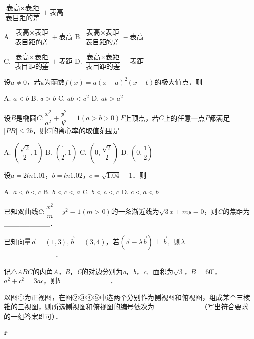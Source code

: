 \documentclass[a4paper,11pt]{report}
\begin{document}
\begin{examquestions}
$\dfrac{\text{表高}\times\text{表距}}{\text{表目距的差}}+\text{表高}$

A.
$\dfrac{\text{表高}\times\text{表距}}{\text{表目距的差}}+\text{表高}$
B.
$\dfrac{\text{表高}\times\text{表距}}{\text{表目距的差}}-\text{表高}$

C.
$\dfrac{\text{表高}\times\text{表距}}{\text{表目距的差}}+\text{表距}$
D.
$\dfrac{\text{表高}\times\text{表距}}{\text{表目距的差}}-\text{表距}$

\item 
设$a\ne0$，若$a$为函数$f(x)=a(x-a)^{2}(x-b)$的极大值点，则

A.
$a<b$
B.
$a>b$
C.
$ab<a^{2}$
D.
$ab>a^{2}$

\item 
设$B$是椭圆$C:\dfrac{x^{2}}{a^{2}}+\dfrac{y^{2}}{b^{2}}=1(a>b>0)$$F$上顶点，若$C$上的任意一点$P$都满足$|PB|\leq2b$，则$C$的离心率的取值范围是

A.
$(\dfrac{\sqrt{2}}{2},1)$
B.
$(\dfrac{1}{2},1)$
C.
$(0,\dfrac{\sqrt{2}}{2})$
D.
$(0,\dfrac{1}{2})$

\item 
设$a=2ln1.01$，$b=ln1.02$，$c=\sqrt{1.04}-1$．则

A.
$a<b<c$
B.
$b<c<a$
C.
$b<a<c$
D.
$c<a<b$

\end{examquestions}
\begin{examquestions}[start=13]

\item 
已知双曲线$C:\dfrac{x^{2}}{m}-y^{2}=1(m>0)$的一条渐近线为$\sqrt{3}x+my=0$，则\emph{C}的焦距为\_\_\_\_\_\_\_\_\_．

\item 
已知向量$\vec{a}=(1,3),\vec{b}=(3,4)$，若$(\vec{a}-\lambda\vec{b})\perp\vec{b}$，则$\lambda=$\_\_\_\_\_\_\_\_\_\_．

\item 
记$\ensuremath{\triangle}ABC$的内角\emph{A}，\emph{B}，\emph{C}的对边分别为\emph{a}，\emph{b}，\emph{c}，面积为$\sqrt{3}$，$B=60^\circ$，$a^{2}+c^{2}=3ac$，则$b=$\_\_\_\_\_\_\_\_．

\item 
以图①为正视图，在图②③④⑤中选两个分别作为侧视图和俯视图，组成某个三棱锥的三视图，则所选侧视图和俯视图的编号依次为\_\_\_\_\_\_\_\_\_（写出符合要求的一组答案即可）．

$\overline{x}$

\end{examquestions}
\end{document}
